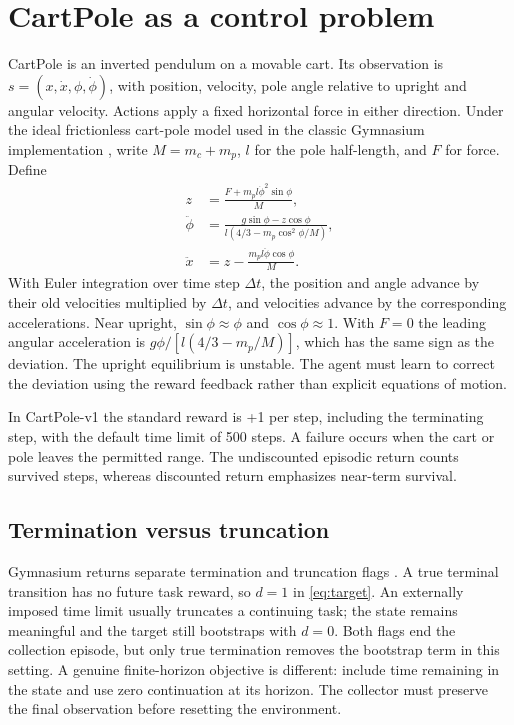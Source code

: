 \documentclass[11pt,a4paper]{article}
\begin{document}
\section{CartPole as a control problem}
CartPole is an inverted pendulum on a movable cart. Its observation is $s=(x,\dot x,\phi,\dot\phi)$, with position, velocity, pole angle relative to upright and angular velocity. Actions apply a fixed horizontal force in either direction. Under the ideal frictionless cart-pole model used in the classic Gymnasium implementation \cite{gymcart}, write $M=m_c+m_p$, $l$ for the pole half-length, and $F$ for force. Define
\begin{align*}
 z&=\frac{F+m_pl\dot\phi^2\sin\phi}{M},\\
 \ddot\phi&=\frac{g\sin\phi-z\cos\phi}{l(4/3-m_p\cos^2\phi/M)},\\
 \ddot x&=z-\frac{m_pl\ddot\phi\cos\phi}{M}.
\end{align*}
With Euler integration over time step $\Delta t$, the position and angle advance by their old velocities multiplied by $\Delta t$, and velocities advance by the corresponding accelerations. Near upright, $\sin\phi\approx\phi$ and $\cos\phi\approx1$. With $F=0$ the leading angular acceleration is $g\phi/[l(4/3-m_p/M)]$, which has the same sign as the deviation. The upright equilibrium is unstable. The agent must learn to correct the deviation using the reward feedback rather than explicit equations of motion.

In CartPole-v1 the standard reward is +1 per step, including the terminating step, with the default time limit of 500 steps. A failure occurs when the cart or pole leaves the permitted range. The undiscounted episodic return counts survived steps, whereas discounted return emphasizes near-term survival.

\subsection{Termination versus truncation}
Gymnasium returns separate termination and truncation flags \cite{gymtime}. A true terminal transition has no future task reward, so $d=1$ in \eqref{eq:target}. An externally imposed time limit usually truncates a continuing task; the state remains meaningful and the target still bootstraps with $d=0$. Both flags end the collection episode, but only true termination removes the bootstrap term in this setting. A genuine finite-horizon objective is different: include time remaining in the state and use zero continuation at its horizon. The collector must preserve the final observation before resetting the environment.
\end{document}
